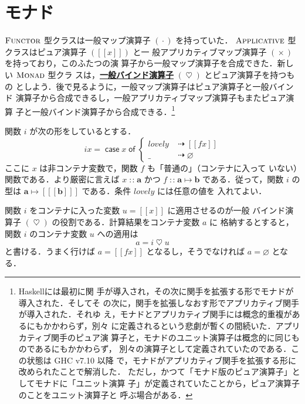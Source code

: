 \documentclass[a5paper,twoside,fleqn,draft]{jsbook}
\def\[{[\![}
\def\]{]\!]}
\newcommand{\programminglanguage}[1]{\textsf{#1}}
\newcommand{\haskell}{\programminglanguage{Haskell}}
\newcommand{\keyword}[1]{{\underline{\textbf{#1}}}}
\newcommand{\mKeyword}[1]{\mathsf{#1}}
\newcommand{\mCaseKeyword}{\mKeyword{case}}
\newcommand{\mOfKeyword}{\mKeyword{of}}
\DeclareMathOperator{\mCaseKW}{\mCaseKeyword}
\DeclareMathOperator{\mOfKW}{\mOfKeyword}
\newcommand{\mPureNothing}{\varnothing}
\newcommand{\mSpecialVar}[1]{\mathit{#1}}
\newcommand{\mLovelyVar}{\mSpecialVar{lovely}}
\DeclareMathOperator{\mAppMap}{\times}
\DeclareMathOperator{\mBind}{\heartsuit}
\DeclareMathOperator{\mIfSo}{\dashrightarrow}
\DeclareMathOperator{\mIn}{{:\!:}}
\DeclareMathOperator{\mMap}{\cdot}
\DeclareMathOperator{\mMapsTo}{\mapsto}
\newcommand{\mType}[1]{\mathbf{#1}} %
\newcommand{\mA}{\mType{a}}
\newcommand{\mB}{\mType{b}}
\newcommand{\mPureType}[1]{[[[\mType{#1}]]]} %
\newcommand{\mPureWith}[1]{\[#1\]}
\newcommand{\mTypeClass}[1]{\textsc{#1}} %
\newcommand{\mApplicativeTypeClass}{\mTypeClass{Applicative}}
\newcommand{\mFunctorTypeClass}{\mTypeClass{Functor}}
\newcommand{\mMonadTypeClass}{\mTypeClass{Monad}}
\newcommand{\mCaseOf}[1]{\mCaseKW#1\mOfKW}
\begin{document}
\section{モナド}

$\mFunctorTypeClass$ 型クラスは一般マップ演算子 $(\mMap)$ を持っていた．
$\mApplicativeTypeClass$ 型クラスはピュア演算子 $(\mPureWith{x})$ と一
般アプリカティブマップ演算子 $(\mAppMap)$ を持っており，このふたつの演
算子から一般マップ演算子を合成できた．新しい $\mMonadTypeClass$ 型クラ
スは，\keyword{一般バインド演算子} $(\mBind)$ とピュア演算子を持つもの
としよう．後で見るように，一般マップ演算子はピュア演算子と一般バインド
演算子から合成できるし，一般アプリカティブマップ演算子もまたピュア演算
子と一般バインド演算子から合成できる．\footnote{\haskell には最初に関
手が導入され，その次に関手を拡張する形でモナドが導入された．そしてそ
の次に，関手を拡張しなおす形でアプリカティブ関手が導入された．それゆ
え，モナドとアプリカティブ関手には概念的重複があるにもかかわらず，別々
に定義されるという悲劇が暫くの間続いた．アプリカティブ関手のピュア演
算子と，モナドのユニット演算子は概念的に同じものであるにもかかわらず，
別々の演算子として定義されていたのである．この状態は GHC v7.10 以降
で，モナドがアプリカティブ関手を拡張する形に改められたことで解消した．
ただし，かつて「モナド版のピュア演算子」としてモナドに「ユニット演算
子」が定義されていたことから，ピュア演算子のことをユニット演算子と
呼ぶ場合がある．}

関数 $i$ が次の形をしているとする．
\begin{equation}
  \label{eq:def-of-i}
  ix=\mCaseOf{x}\begin{cases}
    \mLovelyVar
    &\mIfSo\mPureWith{fx}\\
    \_
    &\mIfSo\mPureNothing
  \end{cases}
\end{equation}
ここに $x$ は非コンテナ変数で，関数 $f$ も「普通の」（コンテナに入って
  いない）関数である．より厳密に言えば $x\mIn\mA$ かつ
$f\mIn\mA\mMapsTo\mB$ である．従って，関数 $i$ の型は
$\mA\mMapsTo\mPureType{b}$ である．条件 $\mLovelyVar$ には任意の値を
  入れてよい．

関数 $i$ をコンテナに入った変数 $u=\mPureWith{x}$ に適用させるのが一般
バインド演算子 $(\mBind)$ の役割である．計算結果をコンテナ変数 $a$ に
格納するとすると，関数 $i$ のコンテナ変数 $u$ への適用は
\begin{equation}
\label{eq:i-love-u}
a=i\mBind u
\end{equation}
と書ける．うまく行けば $a=\mPureWith{fx}$ となるし，そうでなければ
$a=\mPureNothing$ となる．
\end{document}
